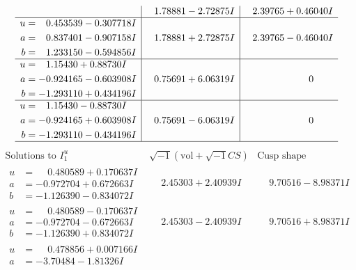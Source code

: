 \documentclass[1p]{elsarticle_modified}
\theoremstyle{definition}
\newcommand{\I}{\sqrt{-1}}
\begin{document}
$$\begin{array}{c|c|c}
 & \phantom{-}1.78881 - 2.72875 I & \phantom{-}2.39765 + 0.46040 I \\ \hline\begin{aligned}
u &= \phantom{-}0.453539 - 0.307718 I \\
a &= \phantom{-}0.837401 - 0.907158 I \\
b &= \phantom{-}1.233150 - 0.594856 I\end{aligned}
 & \phantom{-}1.78881 + 2.72875 I & \phantom{-}2.39765 - 0.46040 I \\ \hline\begin{aligned}
u &= \phantom{-}1.15430 + 0.88730 I \\
a &= -0.924165 - 0.603908 I \\
b &= -1.293110 + 0.434196 I\end{aligned}
 & \phantom{-}0.75691 + 6.06319 I & \phantom{-0.000000 } 0 \\ \hline\begin{aligned}
u &= \phantom{-}1.15430 - 0.88730 I \\
a &= -0.924165 + 0.603908 I \\
b &= -1.293110 - 0.434196 I\end{aligned}
 & \phantom{-}0.75691 - 6.06319 I & \phantom{-0.000000 } 0\\
 \hline 
 \end{array}$$\newpage$$\begin{array}{c|c|c}  
\text{Solutions to }I^u_{1}& \I (\text{vol} + \sqrt{-1}CS) & \text{Cusp shape}\\
 \hline 
\begin{aligned}
u &= \phantom{-}0.480589 + 0.170637 I \\
a &= -0.972704 + 0.672663 I \\
b &= -1.126390 - 0.834072 I\end{aligned}
 & \phantom{-}2.45303 + 2.40939 I & \phantom{-}9.70516 - 8.98371 I \\ \hline\begin{aligned}
u &= \phantom{-}0.480589 - 0.170637 I \\
a &= -0.972704 - 0.672663 I \\
b &= -1.126390 + 0.834072 I\end{aligned}
 & \phantom{-}2.45303 - 2.40939 I & \phantom{-}9.70516 + 8.98371 I \\ \hline\begin{aligned}
u &= \phantom{-}0.478856 + 0.007166 I \\
a &= -3.70484 - 1.81326 I \\

\end{aligned}
\end{array}$$
\end{document}
